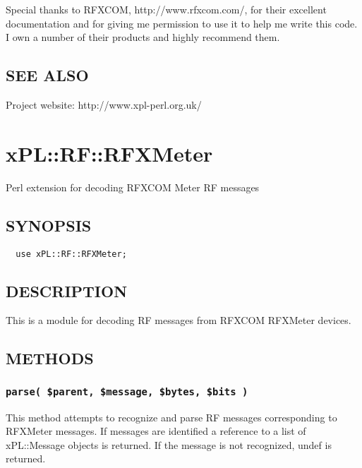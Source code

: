 \documentclass[12pt,a4paper]{article}
\begin{document}
Special thanks to RFXCOM, \textsf{http://www.rfxcom.com/}, for their
excellent documentation and for giving me permission to use it to help
me write this code.  I own a number of their products and highly
recommend them.

\subsection*{SEE ALSO\label{xPL::RF_SEE_ALSO}}


Project website: http://www.xpl-perl.org.uk/

\newpage
\section{xPL::RF::RFXMeter\label{xPL::RF::RFXMeter}}


Perl extension for decoding RFXCOM Meter RF messages

\subsection*{SYNOPSIS\label{xPL::RF::RFXMeter_SYNOPSIS}}
\begin{verbatim}
  use xPL::RF::RFXMeter;
\end{verbatim}
\subsection*{DESCRIPTION\label{xPL::RF::RFXMeter_DESCRIPTION}}


This is a module for decoding RF messages from RFXCOM RFXMeter devices.

\subsection*{METHODS\label{xPL::RF::RFXMeter_METHODS}}
\subsubsection*{\texttt{parse( \$parent, \$message, \$bytes, \$bits )}\label{xPL::RF::RFXMeter_parse_parent_message_bytes_bits_}}


This method attempts to recognize and parse RF messages corresponding
to RFXMeter messages.  If messages are identified a reference to a
list of xPL::Message objects is returned.  If the message is not
recognized, undef is returned.
\end{document}

